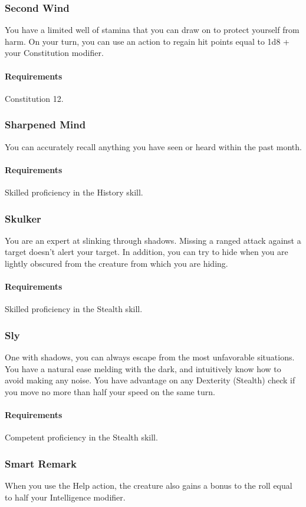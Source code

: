 \subsubsection{Second Wind} \label{feat::secondwind}
    You have a limited well of stamina that you can draw on to protect yourself from harm.
    On your turn, you can use an action to regain hit points equal to 1d8 + your Constitution modifier.
    \paragraph{Requirements} Constitution 12.
\subsubsection{Sharpened Mind} \label{feat::sharpenedmind}
    You can accurately recall anything you have seen or heard within the past month.
    \paragraph{Requirements} Skilled proficiency in the History skill.
\subsubsection{Skulker} \label{feat::skulker}
    You are an expert at slinking through shadows.
    Missing a ranged attack against a target doesn't alert your target.
    In addition, you can try to hide when you are lightly obscured from the creature from which you are hiding.
    \paragraph{Requirements} Skilled proficiency in the Stealth skill.
\subsubsection{Sly} \label{feat::sly}
    One with shadows, you can always escape from the most unfavorable situations.
    You have a natural ease melding with the dark, and intuitively know how to avoid making any noise.
    You have advantage on any Dexterity (Stealth) check if you move no more than half your speed on the same turn.
    \paragraph{Requirements} Competent proficiency in the Stealth skill.
\subsubsection{Smart Remark} \label{feat::smartremark}
    When you use the Help action, the creature also gains a bonus to the roll equal to half your Intelligence modifier.
